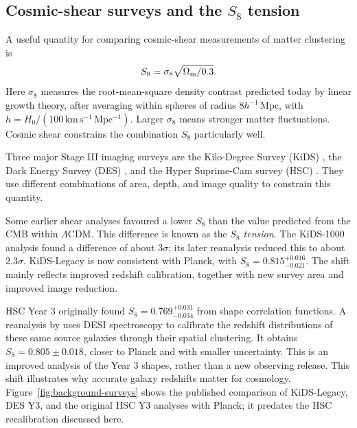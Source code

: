 \subsection{Cosmic-shear surveys and the \texorpdfstring{$S_8$}{S8} tension}
\label{sec:surveys-background}

A useful quantity for comparing cosmic-shear measurements of matter
clustering is
\begin{equation}
  S_8=\sigma_8\sqrt{\Omega_{\rm m}/0.3}.
  \label{eq:clustering-amplitude}
\end{equation}
Here $\sigma_8$ measures the root-mean-square density contrast predicted
today by linear growth theory, after averaging within spheres of radius
$8h^{-1}\,\mathrm{Mpc}$, with
$h=H_0/(100\,\mathrm{km\,s^{-1}\,Mpc^{-1}})$. Larger $\sigma_8$ means stronger
matter fluctuations. Cosmic shear constrains the combination $S_8$
particularly well.

Three major Stage III imaging surveys are the Kilo-Degree Survey (KiDS)
\citep{2025A&A...703A.158W}, the Dark Energy Survey (DES)
\citep{2022PhRvD.105b3514A}, and the Hyper Suprime-Cam survey (HSC)
\citep{2023PhRvD.108l3518L}. They use
different combinations of area, depth, and image quality to constrain this
quantity.

Some earlier shear analyses favoured a lower $S_8$ than the value predicted
from the CMB within $\Lambda$CDM. This difference is known as the
\emph{$S_8$ tension}. The KiDS-1000 analysis \citep{2021A&A...645A.104A}
found a difference of about $3\sigma$; its later reanalysis
\citep{2023A&A...679A.133L} reduced this to about $2.3\sigma$.
KiDS-Legacy \citep{2025A&A...703A.158W} is now consistent with Planck, with
$S_8=0.815^{+0.016}_{-0.021}$. The shift mainly reflects improved redshift
calibration, together with new survey area and improved image reduction.

HSC Year 3 \citep{2023PhRvD.108l3518L} originally found
$S_8=0.769^{+0.031}_{-0.034}$ from shape correlation functions. A reanalysis by
\citet{ChoppinDeJanvry2025} uses DESI spectroscopy to calibrate the redshift
distributions of these same source galaxies through their spatial
clustering. It obtains $S_8=0.805\pm0.018$, closer to Planck and with smaller
uncertainty. This is an improved analysis of the Year 3 shapes, rather than
a new observing release. This shift illustrates why accurate galaxy
redshifts matter for cosmology. Figure~\ref{fig:background-surveys} shows
the published comparison of KiDS-Legacy, DES Y3, and the original HSC Y3
analyses with Planck; it predates the HSC recalibration discussed here.

